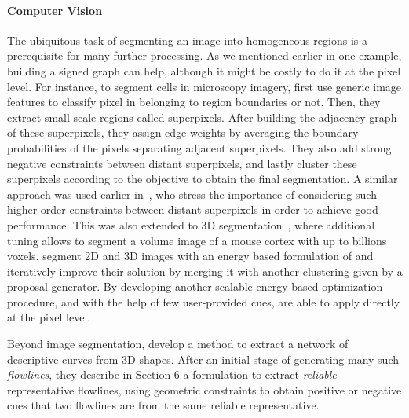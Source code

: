    \paragraph{Computer Vision}
      The ubiquitous task of segmenting an image into homogeneous regions is a prerequisite for many
      further processing. As we mentioned earlier in one example, building a signed graph can help,
      although it might be costly to do it at the pixel level. For instance, to segment cells in
      microscopy imagery, \textcite{CellSeg14} first use generic image features to classify pixel in
      belonging to region boundaries or not. Then, they extract small scale regions called
      superpixels. After building the adjacency graph of these superpixels, they assign edge
      weights by averaging the boundary probabilities of the pixels separating adjacent
      superpixels. They also add strong negative constraints between distant superpixels, and lastly
      cluster these superpixels according to the \pcc{} objective to obtain the final segmentation.
      A similar approach was used earlier in~\textcite{Kim2011}, who stress the importance of
      considering such higher order constraints between distant superpixels in order to achieve good
      performance. This was also extended to 3D segmentation~\autocite{VolumeSegmentation12}, where
      additional tuning allows to segment a volume image of a mouse cortex with up to billions
      voxels. \Textcite{Beier2015} segment 2D and 3D images with an energy based formulation of
      \pcc{} and iteratively improve their solution by merging it with another clustering given by a
      proposal generator. By developing another scalable energy based optimization procedure, and
      with the help of few user-provided cues, \textcite{Bagon2011} are able to apply \pcc{}
      directly at the pixel level.

      Beyond image segmentation, \textcite{Shape3D17} develop a method to extract a network of
      descriptive curves from 3D shapes.  After an initial stage of generating many such
      \emph{flowlines}, they describe in Section 6 a \pcc{} formulation to extract \emph{reliable}
      representative flowlines, using geometric constraints to obtain positive or negative cues that
      two flowlines are from the same reliable representative.

